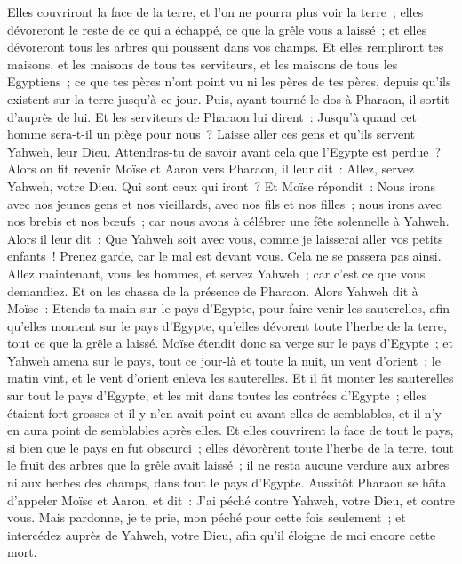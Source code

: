 \begin{multicols}{2}
Elles couvriront la face de la terre, et l'on ne pourra plus voir la terre~; elles dévoreront le reste de ce qui a échappé, ce que la grêle vous a laissé~; et elles dévoreront tous les arbres qui poussent dans vos champs.
Et elles rempliront tes maisons, et les maisons de tous tes serviteurs, et les maisons de tous les Egyptiens~; ce que tes pères n'ont point vu ni les pères de tes pères, depuis qu'ils existent sur la terre jusqu'à ce jour. Puis, ayant tourné le dos à Pharaon, il sortit d'auprès de lui.
Et les serviteurs de Pharaon lui dirent~: Jusqu'à quand cet homme sera-t-il un piège pour nous~? Laisse aller ces gens et qu'ils servent Yahweh, leur Dieu. Attendras-tu de savoir avant cela que l'Egypte est perdue~?
Alors on fit revenir Moïse et Aaron vers Pharaon, il leur dit~: Allez, servez Yahweh, votre Dieu. Qui sont ceux qui iront~?
 Et Moïse répondit~: Nous irons avec nos jeunes gens et nos vieillards, avec nos fils et nos filles~; nous irons avec nos brebis et nos bœufs~; car nous avons à célébrer une fête solennelle à Yahweh.
Alors il leur dit~: Que Yahweh soit avec vous, comme je laisserai aller vos petits enfants~! Prenez garde, car le mal est devant vous.
Cela ne se passera pas ainsi. Allez maintenant, vous les hommes, et servez Yahweh~; car c'est ce que vous demandiez. Et on les chassa de la présence de Pharaon.
Alors Yahweh dit à Moïse~: Etends ta main sur le pays d'Egypte, pour faire venir les sauterelles, afin qu'elles montent sur le pays d'Egypte, qu'elles dévorent toute l'herbe de la terre, tout ce que la grêle a laissé.
Moïse étendit donc sa verge sur le pays d'Egypte~; et Yahweh amena sur le pays, tout ce jour-là et toute la nuit, un vent d'orient~; le matin vint, et le vent d'orient enleva les sauterelles.
Et il fit monter les sauterelles sur tout le pays d'Egypte, et les mit dans toutes les contrées d'Egypte~; elles étaient fort grosses et il y n'en avait point eu avant elles de semblables, et il n'y en aura point de semblables après elles.
Et elles couvrirent la face de tout le pays, si bien que le pays en fut obscurci~; elles dévorèrent toute l'herbe de la terre, tout le fruit des arbres que la grêle avait laissé~; il ne resta aucune verdure aux arbres ni aux herbes des champs, dans tout le pays d'Egypte.
Aussitôt Pharaon se hâta d'appeler Moïse et Aaron, et dit~: J'ai péché contre Yahweh, votre Dieu, et contre vous.
Mais pardonne, je te prie, mon péché pour cette fois seulement~; et intercédez auprès de Yahweh, votre Dieu, afin qu'il éloigne de moi encore cette mort.

\end{multicols}
